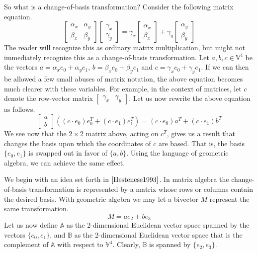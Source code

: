 \documentclass[12pt]{article}
\newcommand{\V}{\mathbb{V}}
\newcommand{\A}{\mathbb{A}}
\newcommand{\B}{\mathbb{B}}
\begin{document}
So what is a change-of-basis transformation?  Consider the following matrix equation.
\begin{equation*}
\left[\begin{array}{cc} \alpha_x & \alpha_y \\ \beta_x & \beta_y \end{array}\right]
\left[\begin{array}{c} \gamma_x \\ \gamma_y \end{array}\right] =
\gamma_x\left[\begin{array}{c} \alpha_x \\ \beta_x \end{array}\right] +
\gamma_y\left[\begin{array}{c} \alpha_y \\ \beta_y \end{array}\right]
\end{equation*}
The reader will recognize this as ordinary matrix multiplication, but might not immediately recognize
this as a change-of-basis transformation.  Let $a,b,c\in\V^4$ be the vectors $a=\alpha_x e_0+\alpha_y e_1$,
$b=\beta_x e_0 + \beta_y e_1$ and $c=\gamma_x e_0 + \gamma_y e_1$.  If we can then be allowed a few small
abuses of matrix notation, the above equation becomes much clearer with these variables.
For example, in the context of matrices, let $c$ denote the row-vector
matrix $[ \begin{array}{cc} \gamma_x & \gamma_y \end{array} ]$.  Let us now rewrite
the above equation as follows.
\begin{equation*}
\left[\begin{array}{c} a \\ b\end{array}\right]((c\cdot e_0)e_0^T+(c\cdot e_1)e_1^T) =
(c\cdot e_0)a^T + (c\cdot e_1)b^T
\end{equation*}
We see now that the $2\times 2$ matrix above, acting on $c^T$, gives us a result that changes the
basis upon which the coordinates of $c$ are based.  That is, the basis $\{e_0,e_1\}$ is swapped
out in favor of $\{a,b\}$.  Using the language of geometric
algebra, we can achieve the same effect.

We begin with an idea set forth in $\cite{Hestenese1993}$.  In matrix algebra the change-of-basis
transformation is represented by a matrix whose rows or columns contain the desired basis.
With geometric algebra we may let a bivector $M$ represent the same transformation.
\begin{equation*}
M = ae_2 + be_3
\end{equation*}
Let us now define $\A$ as the 2-dimensional Euclidean vector space spanned by the
vectors $\{e_0,e_1\}$, and $\B$ as the 2-dimensional Euclidean vector space that
is the complement of $\A$ with respect to $\V^4$.  Clearly, $\B$ is spanned by $\{e_2,e_3\}$.
\end{document}
